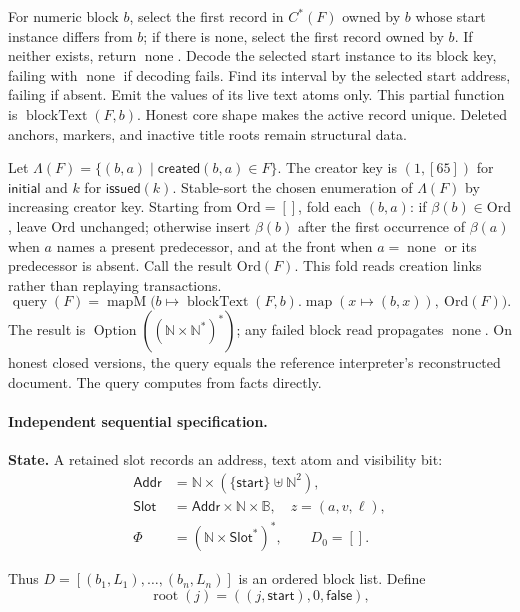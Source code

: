 For numeric block $b$, select the first record in $C^*(F)$ owned by $b$
whose start instance differs from $b$; if there is none, select the first
record owned by $b$. If neither exists, return $\operatorname{none}$.
Decode the selected start instance to its block key, failing with
$\operatorname{none}$ if decoding fails. Find its interval by the selected start
address, failing if absent. Emit the values of its live text atoms only.
This partial function is $\operatorname{blockText}(F,b)$.
Honest core shape makes the active record unique. Deleted anchors,
markers, and inactive title roots remain structural data.

Let $\Lambda(F)=\{(b,a)\mid\mathsf{created}(b,a)\in F\}$.
The creator key is $(1,[65])$ for $\mathsf{initial}$ and $k$ for
$\mathsf{issued}(k)$. Stable-sort the chosen enumeration of $\Lambda(F)$
by increasing creator key. Starting from $\mathrm{Ord}=[]$, fold each $(b,a)$:
if $\beta(b)\in\mathrm{Ord}$, leave $\mathrm{Ord}$ unchanged; otherwise insert $\beta(b)$
after the first occurrence of $\beta(a)$ when $a$ names a present
predecessor, and at the front when $a=\operatorname{none}$ or its predecessor is
absent. Call the result $\mathrm{Ord}(F)$. This fold reads creation links rather
than replaying transactions.
\[
\operatorname{query}(F)=\operatorname{mapM}
  \bigl(b\mapsto\operatorname{blockText}(F,b).\operatorname{map}
  (x\mapsto(b,x)),\ \mathrm{Ord}(F)\bigr).
\]
The result is $\operatorname{Option}((\mathbb N\times\mathbb N^*)^*)$;
any failed block read propagates $\operatorname{none}$. On honest closed versions,
the query equals the reference interpreter's reconstructed document.
The query computes from facts directly.

\paragraph{Independent sequential specification.}
\textbf{State.} A retained slot records an address, text atom and visibility bit:
\[
\begin{aligned}
\mathsf{Addr}&=\mathbb N\times(\{\mathsf{start}\}\uplus\mathbb N^2),\\
\mathsf{Slot}&=\mathsf{Addr}\times\mathbb N\times\mathbb B,\quad z=(a,v,\ell),\\
\Phi&=(\mathbb N\times\mathsf{Slot}^*)^*,\qquad D_0=[].
\end{aligned}
\]

Thus $D=[(b_1,L_1),\ldots,(b_n,L_n)]$ is an ordered block list. Define
\[
\operatorname{root}(j)=((j,\mathsf{start}),0,\mathsf{false}),
\]

